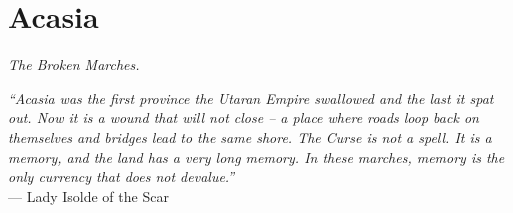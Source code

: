 \documentclass[12pt,oneside]{book}
\begin{document}


\newpage

\chapter{Acasia}
\emph{The Broken Marches.}

\noindent
\textit{``Acasia was the first province the Utaran Empire swallowed and the last it spat out. Now it is a wound that will not close -- a place where roads loop back on themselves and bridges lead to the same shore. The Curse is not a spell. It is a memory, and the land has a very long memory. In these marches, memory is the only currency that does not devalue.''} \\
--- Lady Isolde of the Scar
\end{document}
